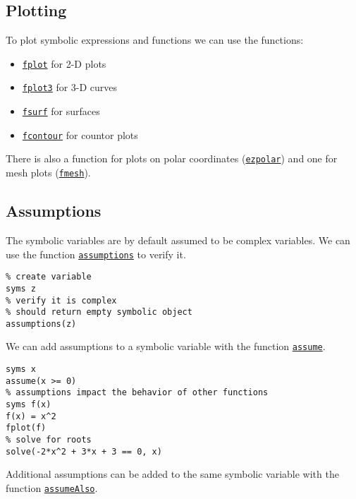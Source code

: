 \documentclass[12pt, a4paper]{article}
\begin{document}
\subsection{Plotting}
\label{sec:orgcbfa39b}
To plot symbolic expressions and functions we can use the functions:
\begin{itemize}
\item \href{https://www.mathworks.com/help/symbolic/fplot.html}{\texttt{fplot}} for 2-D plots
\item \href{https://www.mathworks.com/help/symbolic/fplot3.html}{\texttt{fplot3}} for 3-D curves
\item \href{https://www.mathworks.com/help/symbolic/fsurf.html}{\texttt{fsurf}} for surfaces
\item \href{https://www.mathworks.com/help/symbolic/fcontour.html}{\texttt{fcontour}} for countor plots
\end{itemize}
There is also a function for plots on polar coordinates (\href{https://www.mathworks.com/help/symbolic/ezpolar.html}{\texttt{ezpolar}}) and one for mesh plots (\href{https://www.mathworks.com/help/symbolic/fmesh.html}{\texttt{fmesh}}).
\subsection{Assumptions}
\label{sec:orgf2939f4}
The symbolic variables are by default assumed to be complex variables.
We can use the function \href{https://www.mathworks.com/help/symbolic/assumptions.html}{\texttt{assumptions}} to verify it.
\lstset{language=matlab,label= ,caption= ,captionpos=b,firstnumber=1,numbers=left,style=Matlab-editor}
\begin{lstlisting}
% create variable
syms z
% verify it is complex
% should return empty symbolic object
assumptions(z)
\end{lstlisting}
We can add assumptions to a symbolic variable with the function \href{https://www.mathworks.com/help/symbolic/assume.html}{\texttt{assume}}.
\lstset{language=matlab,label= ,caption= ,captionpos=b,firstnumber=1,numbers=left,style=Matlab-editor}
\begin{lstlisting}
syms x
assume(x >= 0)
% assumptions impact the behavior of other functions
syms f(x)
f(x) = x^2
fplot(f)
% solve for roots
solve(-2*x^2 + 3*x + 3 == 0, x)
\end{lstlisting}
Additional assumptions can be added to the same symbolic variable with the function \href{https://www.mathworks.com/help/symbolic/assumealso.html?s\_tid=doc\_ta}{\texttt{assumeAlso}}.
\end{document}
